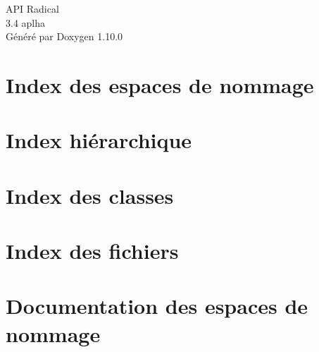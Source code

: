 \documentclass[twoside]{book}
\newcommand{\+}{\discretionary{\mbox{\scriptsize$\hookleftarrow$}}{}{}}
\newcommand{\clearemptydoublepage}{%
    \newpage{\pagestyle{empty}\cleardoublepage}%
  }
\begin{document}
  \raggedbottom
  \begin{titlepage}
  \vspace*{7cm}
  \begin{center}%
  {\Large API Radical}\\
  [1ex]\large 3.\+4 aplha \\
  \vspace*{1cm}
  {\large Généré par Doxygen 1.10.0}\\
  \end{center}
  \end{titlepage}
  \clearemptydoublepage
  \tableofcontents
  \clearemptydoublepage
\chapter{Index des espaces de nommage}

\chapter{Index hiérarchique}

\chapter{Index des classes}

\chapter{Index des fichiers}

\chapter{Documentation des espaces de nommage}




\end{document}
